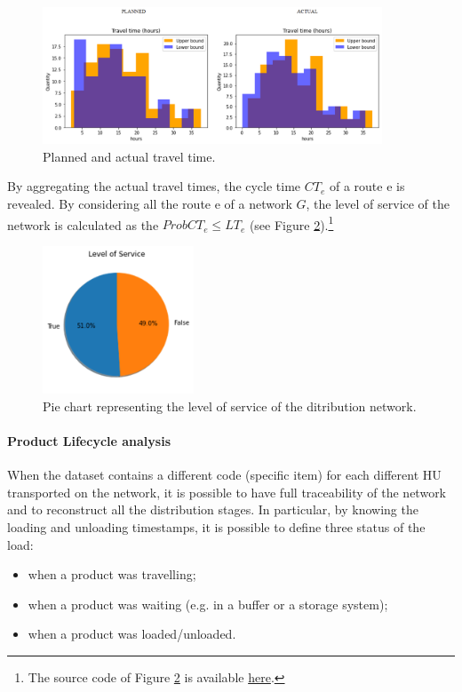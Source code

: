 \begin{figure}[hbt!]
\centering
\includegraphics[width=0.9\textwidth]{SectionDistribution/control_figures/fig_travelTime.png}
\captionsetup{type=figure}
\caption{Planned and actual travel time.}
\label{fig_travelTime}
\end{figure}

By aggregating the actual travel times, the cycle time $CT_e$ of a route e is revealed. By considering all the route e of a network $G$, the level of service of the network is calculated as the $Prob{CT_e\le LT_e}$ (see Figure \ref{fig_serviceLevel}).\footnote{The source code of Figure \ref{fig_serviceLevel} is available \href{https://github.com/aletuf93/logproj/blob/master/examples/DIST_01\%20Supply\%20Chain\%20Assessment.ipynb}{here}.}

\begin{figure}[hbt!]
\centering
\includegraphics[width=0.4\textwidth]{SectionDistribution/control_figures/fig_serviceLevel.png}
\captionsetup{type=figure}
\caption{Pie chart representing the level of service of the ditribution network.}
\label{fig_serviceLevel}
\end{figure}

\paragraph{Product Lifecycle analysis}
When the dataset contains a different code (specific item) for each different HU transported on the network, it is possible to have full traceability of the network and to reconstruct all the distribution stages. In particular, by knowing the loading and unloading timestamps, it is possible to define three status of the load:
\begin{itemize}
    \item when a product was travelling;
    \item when a product was waiting (e.g. in a buffer or a storage system);
    \item when a product was loaded/unloaded.

\end{itemize}

